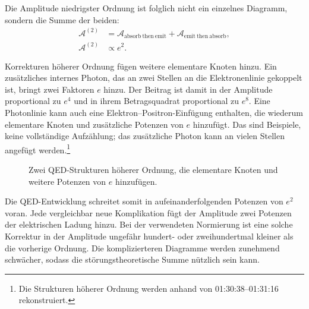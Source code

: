 Die Amplitude niedrigster Ordnung ist folglich nicht ein einzelnes Diagramm, sondern die Summe der beiden:
\begin{equation}
\begin{aligned}
\mathcal{A}^{(2)}
&=
\mathcal{A}_{\mathrm{absorb\ then\ emit}}
+\mathcal{A}_{\mathrm{emit\ then\ absorb}},\\
\mathcal{A}^{(2)}&\propto e^2.
\end{aligned}
\end{equation}

Korrekturen höherer Ordnung fügen weitere elementare Knoten hinzu. Ein zusätzliches internes Photon, das an zwei Stellen an die Elektronenlinie gekoppelt ist, bringt zwei Faktoren \(e\) hinzu. Der Beitrag ist damit in der Amplitude proportional zu \(e^4\) und in ihrem Betragsquadrat proportional zu \(e^8\). Eine Photonlinie kann auch eine Elektron--Positron-Einfügung enthalten, die wiederum elementare Knoten und zusätzliche Potenzen von \(e\) hinzufügt. Das sind Beispiele, keine vollständige Aufzählung; das zusätzliche Photon kann an vielen Stellen angefügt werden.\footnote{Die Strukturen höherer Ordnung werden anhand von 01:30:38--01:31:16 rekonstruiert.}

\begin{figure}[htbp]
\centering
{}
\caption{Zwei QED-Strukturen höherer Ordnung, die elementare Knoten und weitere Potenzen von \(e\) hinzufügen.}
\end{figure}

Die QED-Entwicklung schreitet somit in aufeinanderfolgenden Potenzen von \(e^2\) voran. Jede vergleichbar neue Komplikation fügt der Amplitude zwei Potenzen der elektrischen Ladung hinzu. Bei der verwendeten Normierung ist eine solche Korrektur in der Amplitude ungefähr hundert- oder zweihundertmal kleiner als die vorherige Ordnung. Die komplizierteren Diagramme werden zunehmend schwächer, sodass die störungstheoretische Summe nützlich sein kann.

